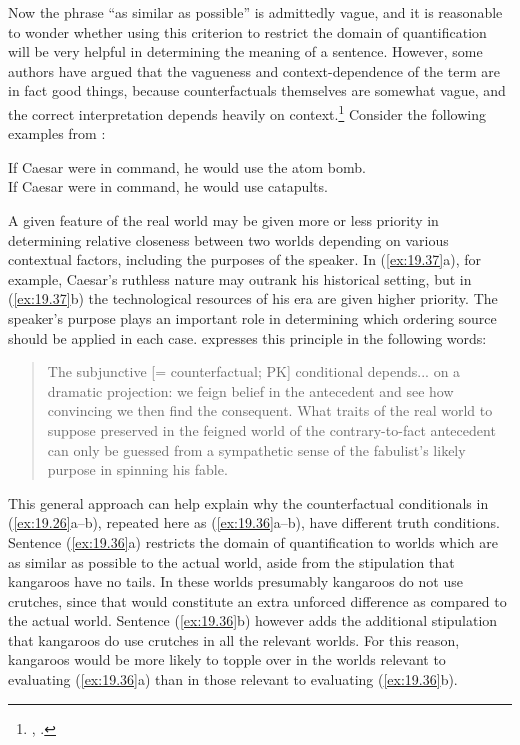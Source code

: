 Now the phrase “as similar as possible” is admittedly vague, and it is reasonable to wonder whether using this criterion to restrict the domain of quantification will be very helpful in determining the meaning of a sentence. However, some authors have argued that the vagueness and context-dependence of the term are in fact good things, because counterfactuals themselves are somewhat vague, and the correct interpretation depends heavily on context.\footnote{\citet[91ff]{Lewis1973a}, \citet{vonFintel2012}.} Consider the following examples from \citet[221]{Quine1960}:\largerpage[2]

\ea \label{ex:19.37}
\ea  If Caesar were in command, he would use the atom bomb.\\
\ex If Caesar were in command, he would use catapults.
                       \z
\z


A given feature of the real world may be given more or less priority in determining relative closeness between two worlds depending on various contextual factors, including the purposes of the speaker. In (\ref{ex:19.37}a), for example, Caesar’s ruthless nature may outrank his historical setting, but in (\ref{ex:19.37}b) the technological resources of his era are given higher priority. The speaker’s purpose plays an important role in determining which ordering source should be applied in each case. \citet[221]{Quine1960} expresses this principle in the following words:


\begin{quote}
The subjunctive [= counterfactual; PK] conditional depends... on a dramatic projection: we feign belief in the antecedent and see how convincing we then find the consequent. What traits of the real world to suppose preserved in the feigned world of the contrary-to-fact antecedent can only be guessed from a sympathetic sense of the fabulist’s likely purpose in spinning his fable.
\end{quote}


This general approach can help explain why the counterfactual conditionals in (\ref{ex:19.26}a--b), repeated here as (\ref{ex:19.36}a--b), have different truth conditions. Sentence (\ref{ex:19.36}a) restricts the domain of quantification to worlds which are as similar as possible to the actual world, aside from the stipulation that kangaroos have no tails. In these worlds presumably kangaroos do not use crutches, since that would constitute an extra unforced difference as compared to the actual world. Sentence (\ref{ex:19.36}b) however adds the additional stipulation that kangaroos do use crutches in all the relevant worlds. For this reason, kangaroos would be more likely to topple over in the worlds relevant to evaluating (\ref{ex:19.36}a) than in those relevant to evaluating (\ref{ex:19.36}b).


